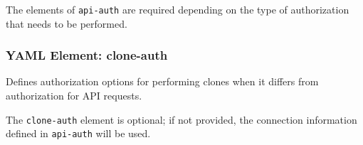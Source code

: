 The elements of \texttt{api-auth} are required depending on the type of authorization that
needs to be performed.

\subsubsection{YAML Element: clone-auth}\label{sec:yaml-connection-clone-auth}
Defines authorization options for performing clones when it differs from authorization for API requests.

The \texttt{clone-auth} element is optional;  if not provided, the connection information defined
in \texttt{api-auth} will be used.